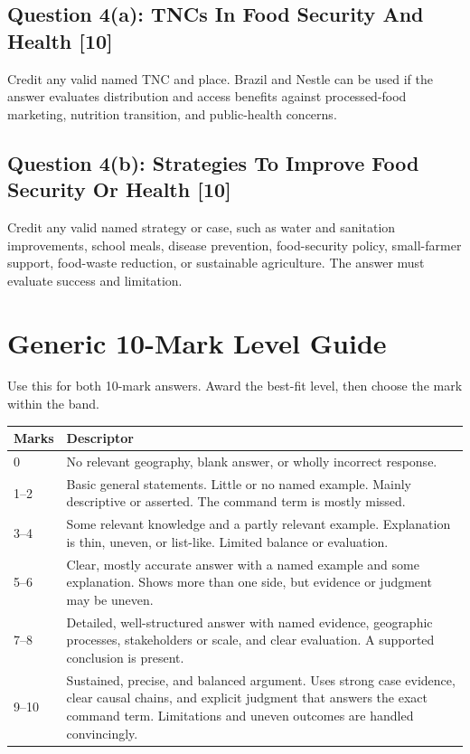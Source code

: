\documentclass[11pt,a4paper]{article}
\begin{document}
\subsection{Question 4(a): TNCs In Food Security And Health [10]}

Credit any valid named TNC and place. Brazil and Nestle can be used if the
answer evaluates distribution and access benefits against processed-food
marketing, nutrition transition, and public-health concerns.

\subsection{Question 4(b): Strategies To Improve Food Security Or Health [10]}

Credit any valid named strategy or case, such as water and sanitation
improvements, school meals, disease prevention, food-security policy,
small-farmer support, food-waste reduction, or sustainable agriculture. The
answer must evaluate success and limitation.

\newpage

\section{Generic 10-Mark Level Guide}

Use this for both 10-mark answers. Award the best-fit level, then choose the
mark within the band.

\begin{tabularx}{\textwidth}{L{0.14\textwidth}Y}
\toprule
\textbf{Marks} & \textbf{Descriptor} \\
 & No relevant geography, blank answer, or wholly incorrect response. \\
1--2 & Basic general statements. Little or no named example. Mainly descriptive
or asserted. The command term is mostly missed. \\
3--4 & Some relevant knowledge and a partly relevant example. Explanation is
thin, uneven, or list-like. Limited balance or evaluation. \\
5--6 & Clear, mostly accurate answer with a named example and some explanation.
Shows more than one side, but evidence or judgment may be uneven. \\
7--8 & Detailed, well-structured answer with named evidence, geographic
processes, stakeholders or scale, and clear evaluation. A supported conclusion
is present. \\
9--10 & Sustained, precise, and balanced argument. Uses strong case evidence,
clear causal chains, and explicit judgment that answers the exact command term.
Limitations and uneven outcomes are handled convincingly. \\
\bottomrule
\end{tabularx}
\end{document}
